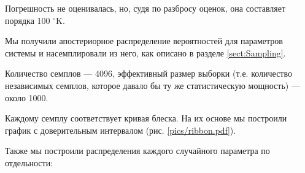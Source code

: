Погрешность не оценивалась, но, судя по разбросу оценок, она составляет порядка 100 ${}^\circ$K.




Мы получили апостериорное распределение вероятностей для параметров системы и насемплировали из него, как описано в разделе \ref{sect:Sampling}.

Количество семплов --- 4096, эффективный размер выборки (т.е. количество независимых семплов, которое давало бы ту же статистическую мощность) --- около 1000.

Каждому семплу соответствует кривая блеска. На их основе мы построили график с доверительным интервалом (рис. \ref{pics/ribbon.pdf}).


Также мы построили распределения каждого случайного параметра по отдельности:

